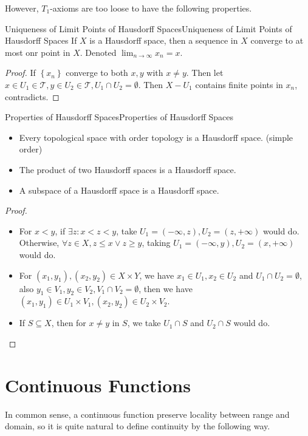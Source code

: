 \documentclass[../main.tex]{subfiles}
\begin{document}
However, $T_1$-axioms are too loose to have the following properties.

\begin{theorem}{Uniqueness of Limit Points of Hausdorff Spaces}{Uniqueness of Limit Points of Hausdorff Spaces}
If $X$ is a Hausdorff space, then a sequence in $X$ converge to at most onr point in $X$. Denoted $\lim_{n \to \infty } x_n = x$.
\end{theorem}
\begin{proof}
If $\left\{ x_n \right\}$ converge to both $x,y$ with $x\neq y$. Then let $x\in U_1\in \mathcal{T},y\in U_2\in \mathcal{T},U_1\cap U_2=\emptyset $. Then $X-U_1$ contains finite points in $x_n$, contradicts.
\end{proof}

\begin{theorem}{Properties of Hausdorff Spaces}{Properties of Hausdorff Spaces}
\begin{itemize}
\item Every topological space with order topology is a Hausdorff space. (simple order)
\item The product of two Hausdorff spaces is a Hausdorff space.
\item A subspace of a Hausdorff space is a Hausdorff space.
\end{itemize}
\end{theorem}

\begin{proof}
\begin{itemize}
\item For $x<y$, if $\exists z: x<z<y$, take $U_1 = (-\infty ,z), U_2 = (z,+\infty )$ would do. Otherwise, $\forall z\in X, z \leq x\lor z\geq y$, taking $U_1 = (-\infty ,y), U_2=(x,+\infty )$ would do.
\item For $(x_1,y_1),(x_2,y_2)\in X \times Y$, we have $x_1\in U_1,x_2\in U_2$ and $U_1\cap U_2=\emptyset $, also $y_1\in V_1,y_2\in V_2,V_1\cap V_2=\emptyset $, then we have $(x_1,y_1)\in U_1 \times V_1,(x_2,y_2)\in U_2 \times V_2$.
\item If $S \subseteq X$, then for $x\neq y$ in $S$, we take $U_1\cap S$ and $U_2\cap S$ would do.
\end{itemize}
\end{proof}


\section{Continuous Functions}
In common sense, a continuous function preserve locality between range and domain, so it is quite natural to define continuity by the following way.
\end{document}
